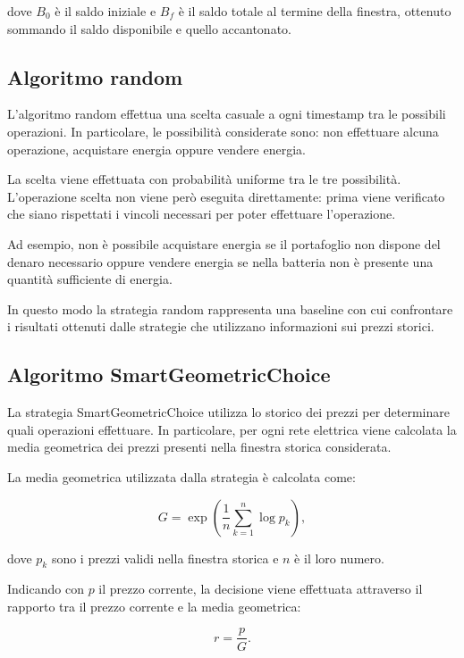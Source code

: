 \documentclass[12pt,a4paper,oneside]{report}
\begin{document}
dove $B_0$ è il saldo iniziale e $B_f$ è il saldo totale al termine della
finestra, ottenuto sommando il saldo disponibile e quello accantonato.

\subsection{Algoritmo random}

L'algoritmo random effettua una scelta casuale a ogni timestamp tra le
possibili operazioni. In particolare, le possibilità considerate sono:
non effettuare alcuna operazione, acquistare energia oppure vendere energia.

La scelta viene effettuata con probabilità uniforme tra le tre possibilità.
L'operazione scelta non viene però eseguita direttamente: prima viene
verificato che siano rispettati i vincoli necessari per poter effettuare
l'operazione.

Ad esempio, non è possibile acquistare energia se il portafoglio non dispone
del denaro necessario oppure vendere energia se nella batteria non è presente
una quantità sufficiente di energia.

In questo modo la strategia random rappresenta una baseline con cui confrontare
i risultati ottenuti dalle strategie che utilizzano informazioni sui prezzi
storici.

\subsection{Algoritmo SmartGeometricChoice}

La strategia SmartGeometricChoice utilizza lo storico dei prezzi per
determinare quali operazioni effettuare. In particolare, per ogni rete
elettrica viene calcolata la media geometrica dei prezzi presenti nella finestra
storica considerata.

La media geometrica utilizzata dalla strategia è calcolata come:

\begin{equation}
    G = \exp\left(\frac{1}{n}\sum_{k=1}^{n}\log p_k\right),
\end{equation}

dove $p_k$ sono i prezzi validi nella finestra storica e $n$ è il loro numero.

Indicando con $p$ il prezzo corrente, la decisione viene effettuata attraverso
il rapporto tra il prezzo corrente e la media geometrica:

\begin{equation}
    r = \frac{p}{G}.
\end{equation}
\end{document}
